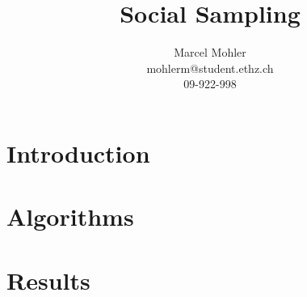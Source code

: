 \documentclass[a4paper,11pt]{article}
\title{\textbf{Social Sampling}}
\author{Marcel Mohler\\
		mohlerm@student.ethz.ch\\
		09-922-998}
\begin{document}
\maketitle

\begin{abstract}

\end{abstract}
\section{Introduction}


\section{Algorithms}


\section{Results}

\end{document}
